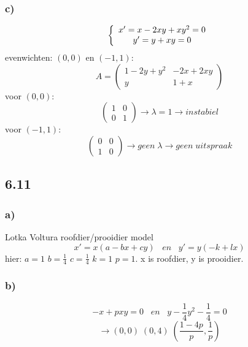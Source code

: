 \documentclass[11pt]{article}
\begin{document}
\subsubsection*{c)}
\[
\left\lbrace
\begin{array}{c c}
x' = x-2xy+xy^2 = 0\\
y' = y+xy = 0
\end{array}
\right.
\]
evenwichten: $(0,0)$ en $(-1,1)$:
\[
A =
\begin{pmatrix}
1-2y+y^2 & -2x+2xy\\
y & 1+x
\end{pmatrix}
\]
voor $(0,0)$:
\[
\begin{pmatrix}
1 & 0 \\
0 & 1 
\end{pmatrix}
\longrightarrow
\lambda=1
\longrightarrow
instabiel
\]
voor $(-1,1)$:
\[
\begin{pmatrix}
0 & 0 \\
1 & 0
\end{pmatrix}
\longrightarrow
geen\;\lambda
\longrightarrow
geen\;uitspraak
\]

\subsection*{6.11}
\subsubsection*{a)}
Lotka Voltura roofdier/prooidier model
\[
x'=x(a-bx+cy)
\;\;\; en \;\;\;
y'=y(-k+lx)
\]
hier:
$a=1$ $b=\frac{1}{4}$ $c=\frac{1}{4}$ $k=1$ $p=1$.
x is roofdier, y is prooidier.

\subsubsection*{b)}
\[
-x+pxy=0 
\;\;\; en \;\;\;
y-\frac{1}{4}y^2-\frac{1}{4} = 0
\]
\[
\longrightarrow (0,0)\;(0,4)\;(\frac{1-4p}{p},\frac{1}{p})
\]
\end{document}
